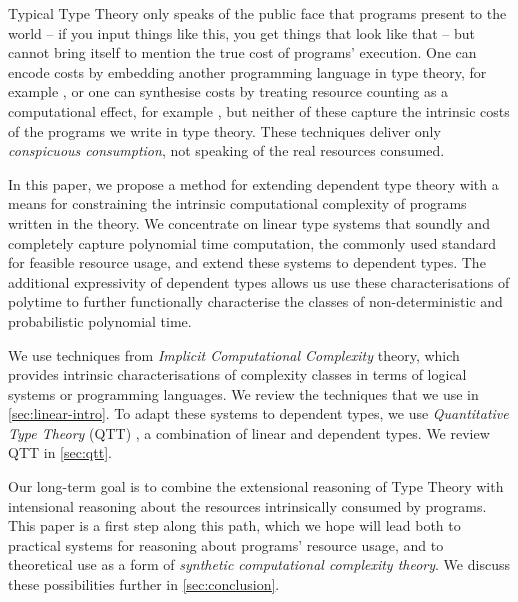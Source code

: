 \documentclass[acmsmall,screen]{acmart}
\begin{document}
Typical Type Theory only speaks of the public face that programs
present to the world -- if you input things like this, you get things
that look like that -- but cannot bring itself to mention the true
cost of programs' execution. One can encode costs by embedding another
programming language in type theory, for example \cite{GueneauCP18},
or one can synthesise costs by treating resource counting as a
computational effect, for example \cite{Danielsson08,NiuSGH22}, but
neither of these capture the intrinsic costs of the programs we write
in type theory. These techniques deliver only \emph{conspicuous
  consumption}, not speaking of the real resources consumed.

In this paper, we propose a method for extending dependent type theory
with a means for constraining the intrinsic computational complexity
of programs written in the theory. We concentrate on linear type
systems that soundly and completely capture polynomial time
computation, the commonly used standard for feasible resource usage,
and extend these systems to dependent types. The additional
expressivity of dependent types allows us use these characterisations
of polytime to further functionally characterise the classes of
non-deterministic and probabilistic polynomial time.

We use techniques from \emph{Implicit Computational Complexity}
theory, which provides intrinsic characterisations of complexity
classes in terms of logical systems or programming languages. We
review the techniques that we use in \autoref{sec:linear-intro}. To
adapt these systems to dependent types, we use \emph{Quantitative Type
  Theory} (QTT) \cite{atkey18qtt,mcbride16}, a combination of linear
and dependent types. We review QTT in \autoref{sec:qtt}.

Our long-term goal is to combine the extensional reasoning of Type
Theory with intensional reasoning about the resources intrinsically
consumed by programs. This paper is a first step along this path,
which we hope will lead both to practical systems for reasoning about
programs' resource usage, and to theoretical use as a form of
\emph{synthetic computational complexity theory}. We discuss these
possibilities further in \autoref{sec:conclusion}.


\end{document}
